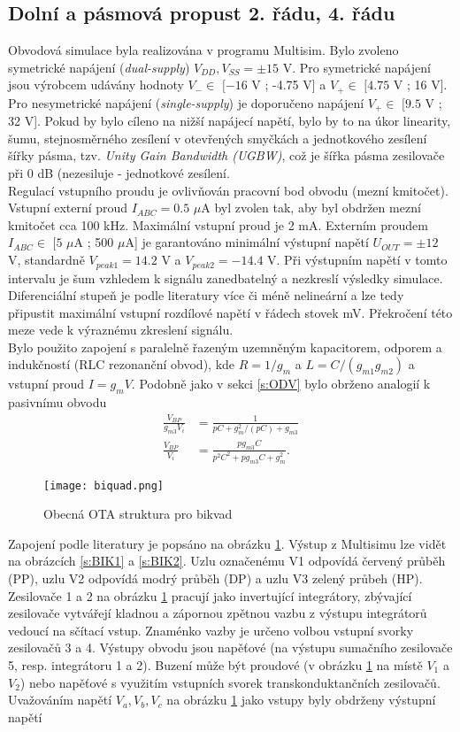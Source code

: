 \subsection{Dolní a pásmová propust 2. řádu, 4. řádu}\label{s:DP2}
\noindent Obvodová simulace byla realizována v programu Multisim. Bylo zvoleno symetrické napájení (\textit{dual-supply}) $V_{DD},V_{SS} = \pm 15$ V. Pro symetrické napájení jsou výrobcem udávány hodnoty $V_{-} \in$ $[-16$ V ; -4.75 V] a $V_{+} \in$ $[4.75$ V ; 16 V]. Pro nesymetrické napájení (\textit{single-supply}) je doporučeno napájení $V_{+} \in$ $[9.5$ V ; 32 V]. Pokud by bylo cíleno na nižší napájecí napětí, bylo by to na úkor linearity, šumu, stejnosměrného zesílení v otevřených smyčkách a jednotkového zesílení šířky pásma, tzv. \textit{Unity Gain Bandwidth (UGBW)}, což je šířka pásma zesilovače při 0 dB (nezesiluje - jednotkové zesílení.\\
Regulací vstupního proudu je ovlivňován pracovní bod obvodu (mezní kmitočet). Vstupní externí proud $I_{ABC} = 0.5$ $\mu$A byl zvolen tak, aby byl obdržen mezní kmitočet cca 100 kHz. Maximální vstupní proud je 2 mA. Externím proudem $I_{ABC} \in$ $[5$ $\mu$A ; 500 $\mu$A] je garantováno minimální výstupní napětí $U_{OUT} = \pm 12$ V, standardně $V_{peak 1} = 14.2$ V a $V_{peak 2} = -14.4$ V. Při výstupním napětí v tomto intervalu je šum vzhledem k signálu zanedbatelný a nezkreslí výsledky simulace.\\
\noindent Diferenciální stupeň je podle literatury \cite{8} více či méně nelineární a lze tedy připustit maximální vstupní rozdílové napětí v řádech stovek mV. Překročení této meze vede k výraznému zkreslení signálu.\\
\noindent Bylo použito zapojení s paralelně řazeným uzemněným kapacitorem, odporem a indukčností (RLC rezonanční obvod), kde $R = 1/g_m$ a $L = C/(g_{m1}g_{m2})$ a vstupní proud $I = g_mV$. Podobně jako v sekci \ref{s:ODV} bylo obrženo analogií k pasivnímu obvodu
\begin{align}
\frac{V_{BP}}{g_{m3}V_i} &= \frac{1}{pC + g_m^2/(pC) + g_{m3}}\\
\frac{V_{BP}}{V_i} &= \frac{pg_{m3}C}{p^2C^2 + pg_{m3}C + g_m^2}.
\end{align}
\begin{figure}[h]
\centering
\texttt{[image: biquad.png]}
\caption[Obecná OTA struktura pro bikvad]{Obecná OTA struktura pro bikvad \label{s:BIK}}
\end{figure}
\noindent Zapojení podle literatury \cite{18} je popsáno na obrázku \ref{s:BIK}. Výstup z Multisimu lze vidět na obrázcích \ref{s:BIK1} a \ref{s:BIK2}. Uzlu označenému V1 odpovídá červený průběh (PP), uzlu V2 odpovídá modrý průběh (DP) a uzlu V3 zelený průbeh (HP). Zesilovače 1 a 2 na obrázku \ref{s:BIK} pracují jako invertující integrátory, zbývající zesilovače vytvářejí kladnou a zápornou zpětnou vazbu z výstupu integrátorů vedoucí na sčítací vstup. Znaménko vazby je určeno volbou vstupní svorky zesilovačů 3 a 4. Výstupy obvodu jsou napěťové (na výstupu sumačního zesilovače 5, resp. integrátoru 1 a 2). Buzení může být proudové (v obrázku \ref{s:BIK} na místě $V_1$ a $V_2$) nebo napěťové s využitím vstupních svorek transkonduktančních zesilovačů. Uvažováním napětí $V_a, V_b, V_c$ na obrázku \ref{s:BIK} jako vstupy byly obdrženy výstupní napětí
